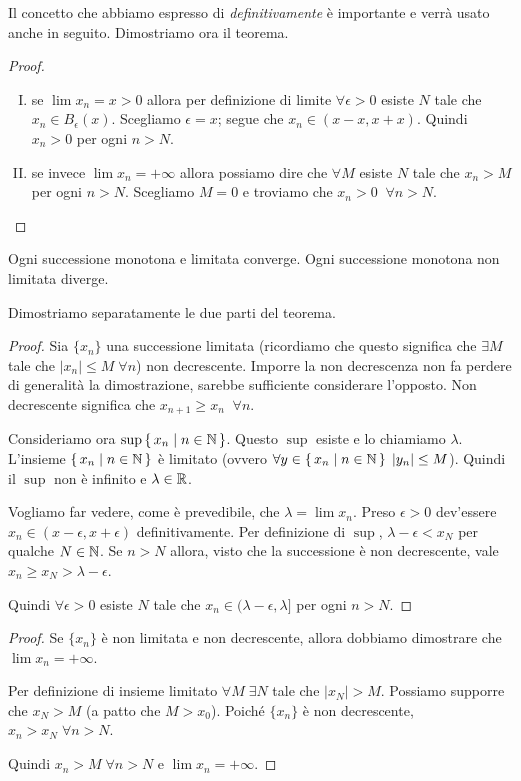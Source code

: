Il concetto che abbiamo espresso di \emph{definitivamente} è importante e verrà usato anche in seguito. Dimostriamo ora il teorema.

\begin{proof} \hfill
\begin{enumerate}[I.]
\item se $\lim x_n = x > 0$ allora per definizione di limite $\forall \epsilon > 0$ esiste $N$ tale che $x_n \in B_{\epsilon}(x)$. Scegliamo $\epsilon = x$; segue che $x_n \in (x-x, x+x)$. Quindi $x_n > 0$ per ogni $n > N$.
\item se invece $\lim x_n = +\infty$ allora possiamo dire che $\forall M$ esiste $N$ tale che $x_n > M$ per ogni $n > N$. Scegliamo $M = 0$ e troviamo che $x_n > 0 \; \; \forall n > N$.
\end{enumerate}
\end{proof}

\begin{theorem}
Ogni successione monotona e limitata converge. Ogni successione monotona non limitata diverge. 
\end{theorem}

Dimostriamo separatamente le due parti del teorema.

\begin{proof}
Sia $\{x_n\}$ una successione limitata (ricordiamo che questo significa che $\exists M$ tale che $|x_n| \le M \; \forall n$) non decrescente. Imporre la non decrescenza non fa perdere di generalità la dimostrazione, sarebbe sufficiente considerare l'opposto. Non decrescente significa che $x_{n+1} \ge x_n \;\; \forall n$.

Consideriamo ora $\sup \set{x_n | n \in \mathbb N}$. Questo $\sup$ esiste e lo chiamiamo $\lambda$. L'insieme $\set{x_n | n \in \mathbb N}$ è limitato (ovvero $\forall y \in \set{x_n | n \in \mathbb N} \; |y_n| \le M$). Quindi il $\sup$ non è infinito e $\lambda \in \mathbb R$.

Vogliamo far vedere, come è prevedibile, che $\lambda = \lim x_n$. Preso $\epsilon > 0$ dev'essere $x_n \in (x-\epsilon, x+\epsilon)$ definitivamente. Per definizione di $\sup$, $\lambda - \epsilon < x_N$ per qualche $N \in \mathbb N$. Se $n > N$ allora, visto che la successione è non decrescente, vale $x_n \ge x_N > \lambda - \epsilon$.

Quindi $\forall \epsilon > 0$ esiste $N$ tale che $x_n \in (\lambda - \epsilon, \lambda]$ per ogni $n > N$.
\end{proof}

\begin{proof}
Se $\{x_n\}$ è non limitata e non decrescente, allora dobbiamo dimostrare che $\lim x_n = +\infty$.

Per definizione di insieme limitato $\forall M \; \exists N$ tale che $|x_N|>M$. Possiamo supporre che $x_N > M$ (a patto che $M > x_0$). Poiché $\{x_n\}$ è non decrescente, $x_n > x_N \; \forall n > N$.

Quindi $x_n > M \; \forall n > N$ e $\lim x_n = +\infty$.
\end{proof}

